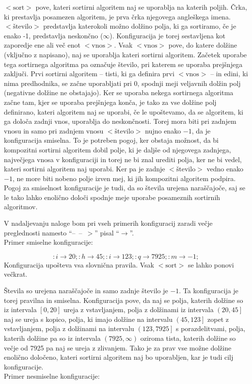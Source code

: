 \documentclass[a4paper,oneside,10pt]{article}
\newcommand{\ntm}[1]{\ensuremath{<\!\!\text{#1}\!\!>}}
\newcommand{\konfarrow}{\mbox{--}~\mbox{--}~\mbox{\ensuremath{>}}}
\newcommand{\lra}{\ensuremath{\longrightarrow}}
\begin{document}
\ntm{sort} pove, kateri sortirni algoritem naj se uporablja na katerih poljih. Črka, ki
prestavlja posamezen algoritem, je prva črka njegovega angleškega imena.
\ntm{število} predstavlja katerokoli možno dolžino polja, ki ga sortiramo, če je enako -1,
predstavlja neskončno ($\infty$).
Konfiguracija je torej sestavljena kot zaporedje ene ali več enot \ntm{vnos}. 
Vsak \ntm{vnos} pove, do katere dolžine (vključno z napisano), naj se uporablja kateri sortirni
algoritem. Začetek uporabe tega sortirnega algoritma pa označuje število, pri katerem se
uporaba prejšnjega zaključi. Prvi sortirni algoritem -- tisti, ki ga definira prvi
\ntm{vnos} -- in edini, ki nima predhodnika, se začne uporabljati pri 0, spodnji meji veljavnih dolžin
polj (negativne dolžine ne obstajajo). Ker se uporaba nekega sortirnega algoritma začne
tam, kjer se uporaba prejšnjega konča, je tako za vse dolžine polj definirano, kateri
algoritem naj se uporabi, če le upoštevamo, da se algoritem, ki ga določa zadnji vnos,
uporablja do neskončnosti. Torej mora biti pri zadnjem vnosu in samo pri zadnjem vnosu 
\ntm{število} nujno enako $-1$, da je konfiguracija smiselna. To je potreben pogoj, ker obstaja možnost, da bi
kompozitni sortirni algoritem dobil polje, ki je daljše od njegovega zadnjega, največjega
vnosa v konfiguraciji in torej ne bi znal urediti polja, ker ne bi vedel, kateri sortirni
algoritem naj uporabi. Ker pa je zadnje \ntm{število} vedno enako $-1$, ne more biti nobeno
polje izven mej, ki jih kompozitni algoritem podpira.
Pogoj za smiselnost konfiguracije je tudi, da so števila urejena naraščajoče, saj se le tako lahko
enolično določi spodnje meje uporabe posameznih sortirnih algoritmov. 

V nadaljevanju naloge bom pri vseh primerih konfiguracij zaradi večje preglednosti 
namesto ``\konfarrow'' pisal ``\lra''.
\\
Primer smiselne konfiguracije:

\[ :i \lra 20;:h \lra 45;:i \lra 123;:q \lra 7925;:m \lra -1; \]
Konfiguracija upošteva vsa slovnična pravila. Vsak \ntm{sort} se lahko ponovi večkrat.

Števila so urejena naraščajoče in samo zadnje število je $-1$. Ta konfiguracija je torej
pravilna in smiselna. Konfiguracija pove, da naj se polja, katerih dolžine so iz intervala $\left[0,
20\right]$ ureja z vstavljanjem, polja z dolžinami iz intervala $\left(20, 45\right]$ naj
se ureja s kopico, polja, ki imajo dolžine na intervalu $\left(45, 123\right]$ zopet z vstavljanjem,
polja z dolžinami na intervalu $\left(123, 7925\right]$ s porazdelitvami, polja, katerih dolžine pa so iz
intervala $\left(7925, \infty\right)$ oziroma tista, katerih dolžine so večje od 7925
pa naj se ureja z zlivanjem. Tako je za prav vse možne dolžine enolično določeno, kateri
sortirni algoritem naj bo uporabljen, kar je tudi cilj konfiguracije.
\\
Primer nesmiselne konfiguracije:
\end{document}

